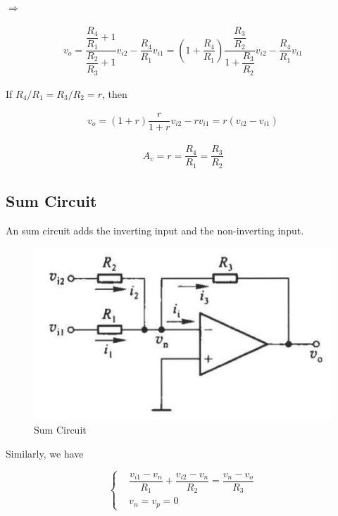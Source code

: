 $\Rightarrow$

\begin{equation*}
  \begin{aligned}
    v_o = \dfrac{\dfrac{R_4}{R_1} + 1 }{\dfrac{R_2}{R_3} + 1 } v_{i2} - \dfrac{R_4}{R_1} v_{i1}  = \left( 1 + \dfrac{R_4}{R_1}  \right) \dfrac{\dfrac{R_3}{R_2} }{1 + \dfrac{R_3}{R_2} } v_{i2} - \dfrac{R_4}{R_1} v_{i1} 
  \end{aligned}
\end{equation*}

If $R_4 / R_1 = R_3 / R_2 = r$, then

\begin{equation*}
  \begin{aligned}
    v_o = \left( 1 + r \right) \dfrac{r}{1 + r} v_{i2} - r v_{i1} = r \left( v_{i2} - v_{i1} \right) 
  \end{aligned}
\end{equation*}

\begin{equation*}
  \begin{aligned}
    A_v = r = \dfrac{R_4}{R_1} = \dfrac{R_3}{R_2}  
  \end{aligned}
\end{equation*}

\subsection{Sum Circuit}

An sum circuit adds the inverting input and the non-inverting input.

\begin{figure}[H]
  \centering
  \includegraphics[width=0.4\linewidth]{figures/sum-amplifier}
  \caption{Sum Circuit}
  \label{fig:}
\end{figure}

Similarly, we have

\begin{equation*}
  \left\{
  \begin{aligned}
    & \dfrac{v_{i1} - v_n}{R_1} + \dfrac{v_{i2}- v_n}{R_2} = \dfrac{v_n - v_o}{R_3} \\
    & v_n= v_p = 0
  \end{aligned}
  \right.
\end{equation*}

